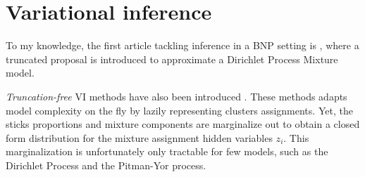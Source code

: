 \section{Variational inference} \label{BNP_VI}
To my knowledge, the first article tackling inference in a \gls{BNP} setting is \cite{Blei:2006fo}, where
a truncated proposal is introduced to approximate a Dirichlet Process Mixture model.

\textit{Truncation-free} \acrlong{VI} methods have also been introduced \cite{Blei:2012uu}. These methods adapts model complexity on the fly by lazily representing clusters assignments. Yet, the sticks proportions and mixture components are marginalize out to obtain a closed form distribution for the mixture assignment hidden variables $z_i$. This marginalization is unfortunately only tractable for few models, such as the Dirichlet Process and the Pitman-Yor process.
